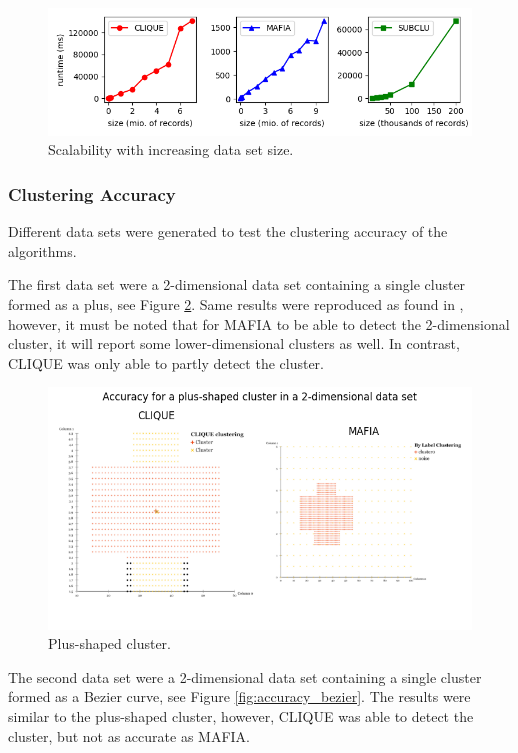\begin{figure}
    \centering
    \includegraphics[scale=0.6]{figures/dataset_size_vs_runtime.png}
    \caption{Scalability with increasing data set size.}
    \label{fig:dataset_size_vs_runtime}
\end{figure}

\subsubsection{Clustering Accuracy}
Different data sets were generated to test the clustering accuracy of the algorithms.

The first data set were a 2-dimensional data set containing a single cluster formed as a plus, see Figure \ref{fig:accuracy_plus}. Same results were reproduced as found in \cite{mafia}, however, it must be noted that for MAFIA to be able to detect the 2-dimensional cluster, it will report some lower-dimensional clusters as well. In contrast, CLIQUE was only able to partly detect the cluster.
\begin{figure}
    \centering
    \includegraphics[scale=0.45]{figures/accuracy_plus.png}
    \caption{Plus-shaped cluster.}
    \label{fig:accuracy_plus}
\end{figure}

The second data set were a 2-dimensional data set containing a single cluster formed as a Bezier curve, see Figure \ref{fig:accuracy_bezier}. The results were similar to the plus-shaped cluster, however, CLIQUE was able to detect the cluster, but not as accurate as MAFIA.

